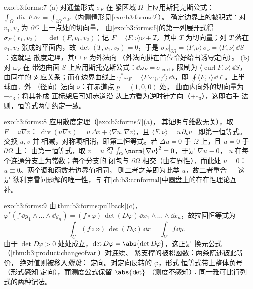 \begin{solution}{exo:b3:forms:7}
(a) 对通量形式 $\sigma_F$ 在
紧区域 $\Omega$ 上应用斯托克斯公式：
$\int_\Omega\operatorname{div}F\,\dd x =
\int_{\partial\Omega}\sigma_F$（内侧情形见\cref{exo:b3:forms:2}）。
确定边界上的被积式：对
$v_1, v_2$ 为 $\partial\Omega$ 上一点处的切向量，
由\cref{exo:b3:forms:5}的第一列展开式得
$\sigma_F(v_1, v_2) = \det(F, v_1, v_2)$；记 $F =
\langle F, \nu\rangle\nu + T$，其中 $T$ 为切向量；列
$T$ 落在 $v_1, v_2$ 张成的平面内，故 $\det(T,
v_1, v_2) = 0$，于是
$\sigma_F\vert_{\partial\Omega} = \langle F,
\nu\rangle\,\sigma_\nu = \langle F, \nu\rangle\,\dd S$：这就是
散度定理，其中 $\nu$ 为外法向
（外法向排在首位恰好给出诱导定向）。
(b) 对 $\omega_F$ 在
带边曲面 $S$ 上应用斯托克斯公式：$\dd\omega_F =
\sigma_{\operatorname{curl}F}$ 限制为
$\langle\operatorname{curl}F, \nu\rangle\,\dd S$，由同样的
对应关系；而在边界曲线上
$\gamma^*\omega_F = \langle F\circ\gamma,
\gamma'\rangle\,\dd t$，即 $\oint\langle F,
\tau\rangle\,\dd\ell$。上半球面，外
（径向）法向 $\nu$：在赤道点 $p = (1,0,0)$ 处，
曲面内向外的切向量为 $-e_3$；将其补成
正标架后可知赤道沿
从上方看为逆时针方向（$+e_3$），这即右手
法则，恒等式两侧约定一致。
\end{solution}

\begin{solution}{exo:b3:forms:8}
应用散度定理（\cref{exo:b3:forms:7}(a)，
其证明与维数无关），取 $F = u\nabla v$：
$\operatorname{div}(u\nabla v) = u\,\Delta v + \langle\nabla
u, \nabla v\rangle$，且 $\langle F, \nu\rangle =
u\,\partial_\nu v$：即第一恒等式。交换 $u, v$ 并
相减，对称项相消，即第二恒等式。若
$\Delta u = 0$ 于 $\Omega$ 上，且 $u = 0$ 于 $\partial\Omega$ 上：
由第一恒等式，取 $v = u$ 得
$\int_\Omega\norm{\nabla u}^2 = 0$，于是 $\nabla u \equiv 0$，
$u$ 在每个连通分支上为常数；每个分支的
闭包与 $\partial\Omega$ 相交（由有界性），而此处 $u = 0$：
$u \equiv 0$。两个调和函数若边界值相同，
则二者之差即为此类 $u$，故二者重合 --- 这是
狄利克雷问题解的唯一性，与
在\cref{ch:b3:conformal}中圆盘上的存在性理论互补。
\end{solution}

\begin{solution}{exo:b3:forms:9}
由\cref{thm:b3:forms:pullback}(c)，
$\varphi^*(f\,\dd y_1\wedge\dots\wedge\dd y_n) =
(f\circ\varphi)\,\det(D\varphi)\,\dd
x_1\wedge\dots\wedge\dd x_n$，故拉回恒等式为
\[
\int_U(f\circ\varphi)\,\det(D\varphi)\,\dd x = \int_Vf\,\dd
y .
\]
由于 $\det D\varphi > 0$ 处处成立，$\det D\varphi =
\abs{\det D\varphi}$，这正是
换元公式
（\cref{thm:b3:product:changeofvar}）对连续、
紧支撑的被积函数：两条陈述彼此等价，
绝对值则被移入\emph{假设}：
定向。对定向反转的 $\varphi$，形式
恒等式带上整体负号（形式感知
定向），而测度公式保留 $\abs{\det}$
（测度不感知）：同一雅可比行列式的两种记法。
\end{solution}

